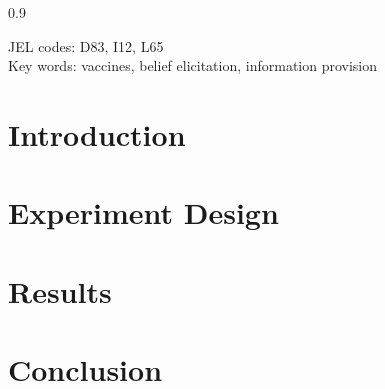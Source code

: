 \documentclass[12pt, english]{article}
\begin{document}
\begin{spacing}{0.9}
\begin{titlepage}

\maketitle

\thispagestyle{empty}



\begin{abstract}

\end{abstract}
\vspace{0.2in}
{{\small JEL codes: D83, I12, L65
\\ 
Key words: vaccines, belief elicitation, information provision }}

\end{titlepage}
    
\end{spacing}

\onehalfspacing


\section{Introduction} 
    \label{sec:intro}
    


\section{Experiment Design} 
    \label{sec:design}
     
   

\section{Results} 
    \label{sec:design}
     
   

\section{Conclusion}
    \label{sec:conclusion}
    

\newpage





\newpage
\singlespacing





\clearpage
\appendix
\setcounter{table}{0}
\renewcommand{\thetable}{A.\arabic{table}}

\clearpage
\setcounter{figure}{0}
\renewcommand{\thefigure}{A.\arabic{figure}}





\appendix
\setcounter{table}{0}
\renewcommand{\thetable}{B.\arabic{table}}

\clearpage
\setcounter{figure}{0}
\renewcommand{\thefigure}{B.\arabic{figure}}


\end{document}
